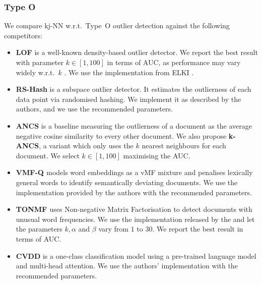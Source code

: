 \subsubsection{Type O} We compare \gls{kj-NN} w.r.t.\ Type~O outlier detection against the following competitors:  
\begin{itemize}[leftmargin=*, noitemsep]
    \item \textbf{\gls{LOF}} is a well-known density-based outlier detector. We report the best result with parameter $k \in [1,100]$ in terms of AUC, as performance may vary widely w.r.t.\ $k$ \cite{DBLP:journals/datamine/CamposZSCMSAH16}. We use the implementation from ELKI %
    \cite{DBLP:journals/pvldb/SchubertKEZSZ15}.%
    \item \textbf{\gls{RS-Hash}} is a subspace outlier detector. 
    It estimates the outlierness of each data point via randomised hashing. We implement it as described by the authors, and we use the recommended parameters. %
    \item \textbf{\gls{ANCS}} is a baseline measuring the outlierness of a document as the average negative cosine similarity to every other document. We also propose \textbf{\gls{k-ANCS}}, a variant which only uses the $k$ nearest neighbours for each document. We select $k \in [1,100]$ maximising the \acrshort{AUC}. 
    \item \textbf{\gls{VMF-Q} \cite{DBLP:conf/emnlp/ZhuangWTKH17}} models word embeddings as a \gls{vMF} mixture and penalises lexically general words to identify semantically deviating documents. 
    We use the implementation provided by the authors with the recommended parameters. 
    \item \textbf{\gls{TONMF} \cite{DBLP:conf/sdm/KannanWAP17}} uses Non-negative Matrix Factorisation %
    to detect documents with unusual word frequencies. 
    We use the implementation released by the %
    and let the parameters $k, \alpha$ and $\beta$ vary from $1$ to $30$. We report the best result in terms of \gls{AUC}.  
    \item \textbf{\gls{CVDD}} is a one-class classification model using a pre-trained language model and multi-head attention. We use the authors' implementation %
    with the recommended parameters.
\end{itemize}

